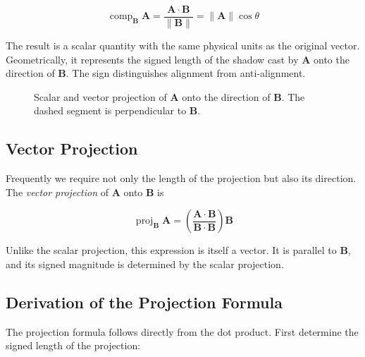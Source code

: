 \[
\boxed{
\operatorname{comp}_{\mathbf B}\mathbf A
=
\frac{\mathbf A\cdot\mathbf B}{\lVert\mathbf B\rVert}
=
\lVert\mathbf A\rVert\cos\theta
}
\]

The result is a scalar quantity with the same physical units as the original
vector. Geometrically, it represents the signed length of the shadow cast by
$\mathbf A$ onto the direction of $\mathbf B$. The sign distinguishes alignment
from anti-alignment.

\begin{figure}[htbp]
\centering
\begingroup

\endgroup
\caption{Scalar and vector projection of $\mathbf A$ onto the direction of
$\mathbf B$. The dashed segment is perpendicular to $\mathbf B$.}
\label{fig:vector-projection}
\end{figure}

\subsection{Vector Projection}

Frequently we require not only the length of the projection but also its
direction. The \emph{vector projection} of $\mathbf A$ onto $\mathbf B$ is

\[
\boxed{
\operatorname{proj}_{\mathbf B}\mathbf A
=
\left(
\frac{\mathbf A\cdot\mathbf B}{\mathbf B\cdot\mathbf B}
\right)\mathbf B
}
\]

Unlike the scalar projection, this expression is itself a vector. It is parallel
to $\mathbf B$, and its signed magnitude is determined by the scalar projection.

\subsection{Derivation of the Projection Formula}

The projection formula follows directly from the dot product. First determine
the signed length of the projection:

